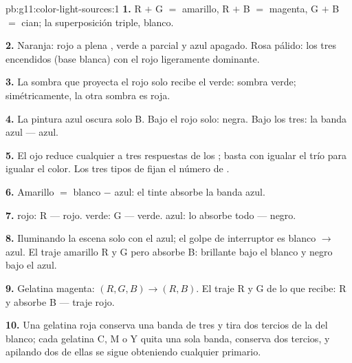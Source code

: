 \begin{solution}{pb:g11:color-light-sources:1}
\textbf{1.} R $+$ G $=$ amarillo, R $+$ B $=$ magenta, G $+$ B $=$
cian; la superposición triple, blanco.

\textbf{2.} Naranja: rojo a plena , verde a  parcial y
azul apagado. Rosa pálido: los tres encendidos (base blanca) con el rojo
ligeramente dominante.

\textbf{3.} La sombra que proyecta el  rojo solo recibe el 
verde: sombra verde; simétricamente, la otra sombra es roja.

\textbf{4.} La pintura azul oscura solo  B. Bajo el  rojo
solo: negra. Bajo los tres:  la banda azul --- azul.

\textbf{5.} El ojo reduce cualquier  a tres respuestas de los
; basta con igualar el trío para igualar el color. Los tres tipos
de  fijan el número de .

\textbf{6.} Amarillo $=$ blanco $-$ azul: el tinte absorbe la banda
azul.

\textbf{7.}  rojo:  R --- rojo.  verde:  G ---
verde.  azul: lo absorbe todo --- negro.

\textbf{8.} Iluminando la escena solo con el  azul; el golpe de
interruptor es blanco $\to$ azul. El traje amarillo  R y G pero
absorbe B: brillante bajo el blanco y negro bajo el azul.

\textbf{9.} Gelatina magenta: $(R, G, B) \to (R, B)$. El traje  R
y G de lo que recibe:  R y absorbe B --- traje rojo.

\textbf{10.} Una gelatina roja conserva una banda de tres y tira dos
tercios de la  del  blanco; cada gelatina C, M o Y quita una
sola banda, conserva dos tercios, y apilando dos de ellas se sigue
obteniendo cualquier primario.


\end{solution}
